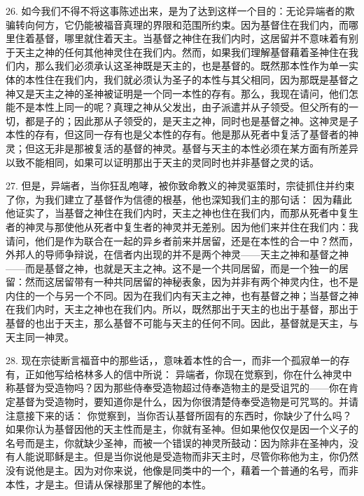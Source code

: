 26. 如今我们不得不将这事陈述出来，是为了达到这样一个目的：无论异端者的欺骗转向何方，它仍能被福音真理的界限和范围所约束。因为基督住在我们内，而哪里住着基督，哪里就住着天主。当基督之神住在我们内时，这居留并不意味着有别于天主之神的任何其他神灵住在我们内。然而，如果我们理解基督藉着圣神住在我们内，那么我们必须承认这圣神既是天主的，也是基督的。既然那本性作为单一实体的本性住在我们内，我们就必须认为圣子的本性与其父相同，因为那既是基督之神又是天主之神的圣神被证明是一个同一本性的存有。那么，我现在请问，他们怎能不是本性上同一的呢？真理之神从父发出，由子派遣并从子领受。但父所有的一切，都是子的；因此那从子领受的，是天主之神，同时也是基督之神。这神灵是子本性的存有，但这同一存有也是父本性的存有。他是那从死者中复活了基督者的神灵；但这无非是那被复活的基督的神灵。基督与天主的本性必须在某方面有所差异以致不能相同，如果可以证明那出于天主的灵同时也并非基督之灵的话。\par

27. 但是，异端者，当你狂乱咆哮，被你致命教义的神灵驱策时，宗徒抓住并约束了你，为我们建立了基督作为信德的根基，他也深知我们主的那句话： 因为藉此他证实了，当基督之神住在我们内时，天主之神也住在我们内，而那从死者中复生者的神灵与那使他从死者中复生者的神灵并无差别。因为他们来并住在我们内：我请问，他们是作为联合在一起的异乡者前来并居留，还是在本性的合一中？然而，外邦人的导师争辩说，在信者内出现的并不是两个神灵——天主之神和基督之神——而是基督之神，也就是天主之神。这不是一个共同居留，而是一个独一的居留：然而这居留带有一种共同居留的神秘表象，因为并非有两个神灵内住，也不是内住的一个与另一个不同。因为在我们内有天主之神，也有基督之神；当基督之神在我们内时，天主之神也在我们内。所以，既然那出于天主的也出于基督，那出于基督的也出于天主，那么基督不可能与天主的任何不同。因此，基督就是天主，与天主同一神灵。\par

28. 现在宗徒断言福音中的那些话，，意味着本性的合一，而非一个孤寂单一的存有，正如他写给格林多人的信中所说： 异端者，你现在觉察到，你在什么神灵中称基督为受造物吗？因为那些侍奉受造物超过侍奉造物主的是受诅咒的——你在肯定基督为受造物时，要知道你是什么，因为你很清楚侍奉受造物是可咒骂的。并请注意接下来的话： 你觉察到，当你否认基督所固有的东西时，你缺少了什么吗？如果你认为基督因他的天主性而是主，你就有圣神。但如果他仅仅是因一个义子的名号而是主，你就缺少圣神，而被一个错误的神灵所鼓动：因为除非在圣神内，没有人能说耶稣是主。但是当你说他是受造物而非天主时，尽管你称他为主，你仍然没有说他是主。因为对你来说，他像是同类中的一个，藉着一个普通的名号，而非本性，才是主。但请从保禄那里了解他的本性。\par

